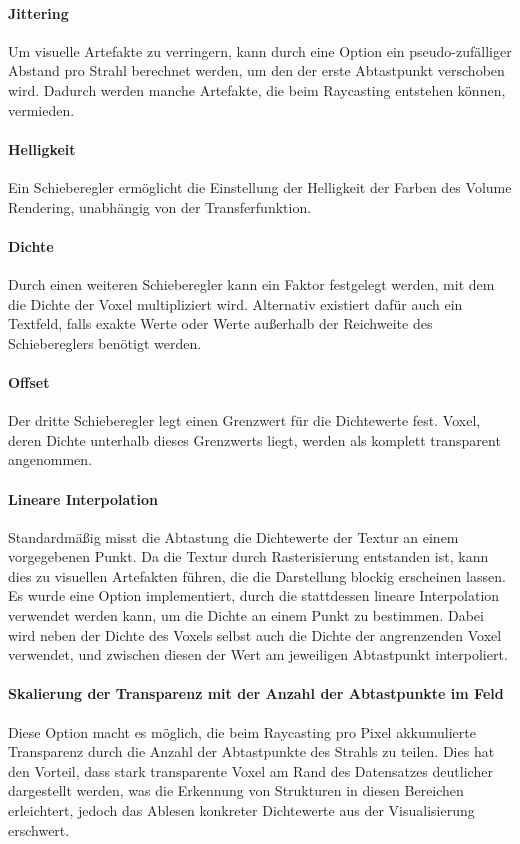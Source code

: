 \documentclass[a4paper,fontsize=12pt,toc=bib,parskip=half,ngerman]{scrartcl}
\begin{document}
\paragraph{Jittering}
Um visuelle Artefakte zu verringern, kann durch eine Option ein pseudo-zuf\"alliger Abstand pro Strahl berechnet werden, um den der erste Abtastpunkt verschoben wird. Dadurch werden manche Artefakte, die beim Raycasting entstehen k\"onnen, vermieden.

\paragraph{Helligkeit}
Ein Schieberegler erm\"oglicht die Einstellung der Helligkeit der Farben des Volume Rendering, unabh\"angig von der Transferfunktion.

\paragraph{Dichte}
Durch einen weiteren Schieberegler kann ein Faktor festgelegt werden, mit dem die Dichte der Voxel multipliziert wird. Alternativ existiert daf\"ur auch ein Textfeld, falls exakte Werte oder Werte au{\ss}erhalb der Reichweite des Schiebereglers ben\"otigt werden.

\paragraph{Offset}
Der dritte Schieberegler legt einen Grenzwert f\"ur die Dichtewerte fest. Voxel, deren Dichte unterhalb dieses Grenzwerts liegt, werden als komplett transparent angenommen.

\paragraph{Lineare Interpolation}
Standardm\"a{\ss}ig misst die Abtastung die Dichtewerte der Textur an einem vorgegebenen Punkt. Da die Textur durch Rasterisierung entstanden ist, kann dies zu visuellen Artefakten f\"uhren, die die Darstellung \glq blockig\grq{} erscheinen lassen. Es wurde eine Option implementiert, durch die stattdessen lineare Interpolation verwendet werden kann, um die Dichte an einem Punkt zu bestimmen. Dabei wird neben der Dichte des Voxels selbst auch die Dichte der angrenzenden Voxel verwendet, und zwischen diesen der Wert am jeweiligen Abtastpunkt interpoliert.

\paragraph{Skalierung der Transparenz mit der Anzahl der Abtastpunkte im Feld}
Diese Option macht es m\"oglich, die beim Raycasting pro Pixel akkumulierte Transparenz durch die Anzahl der Abtastpunkte des Strahls zu teilen. Dies hat den Vorteil, dass stark transparente Voxel am Rand des Datensatzes deutlicher dargestellt werden, was die Erkennung von Strukturen in diesen Bereichen erleichtert, jedoch das Ablesen konkreter Dichtewerte aus der Visualisierung erschwert.
\end{document}
